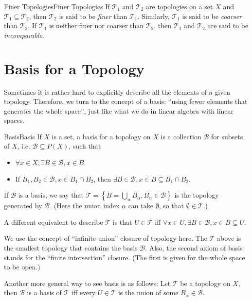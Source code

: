 \documentclass[../main.tex]{subfiles}
\begin{document}
\begin{definition}{Finer Topologies}{Finer Topologies}
	If $\mathcal{T}_1$ and $\mathcal{T}_2$ are topologies on a set $X$ and $\mathcal{T}_1 \subseteq \mathcal{T}_2$, then $\mathcal{T}_2$ is said to be \emph{finer} than $\mathcal{T}_1$. Similarly, $\mathcal{T}_1$ is said to be \emph{coarser} than $\mathcal{T}_2$. If $\mathcal{T}_1$ is neither finer nor coarser than $\mathcal{T}_2$, then $\mathcal{T}_1$ and $\mathcal{T}_2$ are said to be \emph{incomparable}.
\end{definition}

\section{Basis for a Topology}

Sometimes it is rather hard to explicitly describe all the elements of a given topology. Therefore, we turn to the concept of a basis: ``using fewer elements that generates the whole space'', just like what we do in linear algebra with linear spaces.

\begin{definition}{Basis}{Basis}
If $X$ is a set, a basis for a topology on $X$ is a collection $\mathcal{B}$ for subsets of $X$, i.e. $\mathcal{B} \subseteq P(X)$, such that
\begin{itemize}
\item $\forall x\in X, \exists B\in \mathcal{B}, x\in B$.
\item If $B_1,B_2\in \mathcal{B}, x\in B_1\cap B_2$, then $\exists B\in \mathcal{B}, x\in B \subseteq B_1\cap B_2$.
\end{itemize}

If $\mathcal{B}$ is a basis, we say that $\mathcal{T} = \left\{ B = \bigcup_{\alpha} B_{\alpha}, B_{\alpha}\in \mathcal{B} \right\}$ is the topology generated by $\mathcal{B}$. (Here the union index $\alpha$ can take $\emptyset $, so that $\emptyset \in \mathcal{T}$.)

A different equivalent to describe $\mathcal{T}$ is that $U\in \mathcal{T}$ iff $\forall x\in U, \exists B\in \mathcal{B}, x\in B \subseteq U$.
\end{definition}
\begin{remark}
We use the concept of ``infinite union'' closure of topology here. The $\mathcal{T}$ above is the smallest topology that contains the basis $\mathcal{B}$. Also, the second axiom of basis stands for the ``finite intersection'' closure. (The first is given for the whole space to be open.)

\vspace{5pt}
Another more general way to see basis is as follows: Let $\mathcal{T}$ be a topology on $X$, then $\mathcal{B}$ is a basis of $\mathcal{T}$ iff every $U\in \mathcal{T}$ is the union of some $B_{\alpha}\in \mathcal{B}$.
\end{remark}
\end{document}
